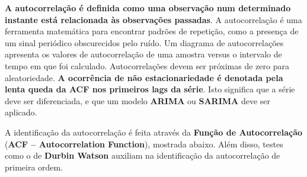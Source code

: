 \documentclass[11pt]{article}
\begin{document}
\textbf{A autocorrelação é definida como uma observação num determinado
instante está relacionada às observações passadas}. A autocorrelação é
uma ferramenta matemática para encontrar padrões de repetição, como a
presença de um sinal periódico obscurecidos pelo ruído. Um diagrama de
autocorrelações apresenta os valores de autocorrelação de uma amostra
versus o intervalo de tempo em que foi calculado. Autocorrelações devem
ser próximas de zero para aleatoriedade. \textbf{A ocorrência de não
estacionariedade é denotada pela lenta queda da ACF nos primeiros lags
da série}. Isto significa que a série deve ser diferenciada, e que um
modelo \textbf{ARIMA} ou \textbf{SARIMA} deve ser aplicado.

A identificação da autocorrelação é feita através da \textbf{Função de
Autocorrelação} (\textbf{ACF -- Autocorrelation Function}), mostrada
abaixo. Além disso, testes como o de \textbf{Durbin Watson} auxiliam na
identificação da autocorrelação de primeira ordem.
\end{document}
